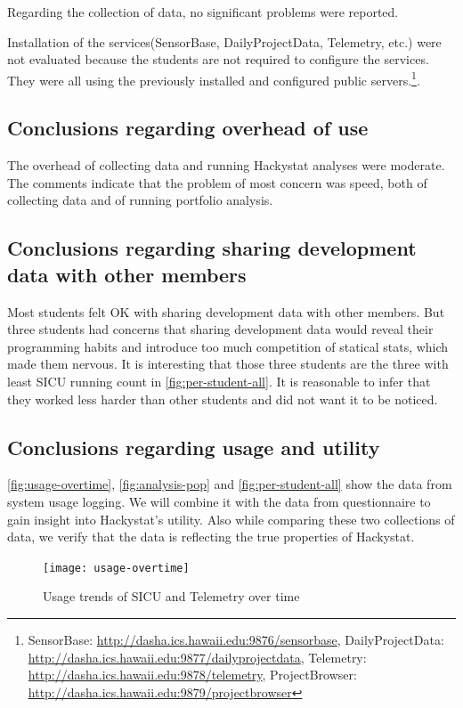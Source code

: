 \documentclass[11pt]{article}
\begin{document}
Regarding the collection of data, no significant problems were reported. 

Installation of the services(SensorBase, DailyProjectData, Telemetry, etc.) were not evaluated because the students are not required to configure the services. They were all using the previously installed and configured public servers.\footnote{SensorBase: \url{http://dasha.ics.hawaii.edu:9876/sensorbase}, DailyProjectData: \url{http://dasha.ics.hawaii.edu:9877/dailyprojectdata}, Telemetry: \url{http://dasha.ics.hawaii.edu:9878/telemetry}, ProjectBrowser: \url{http://dasha.ics.hawaii.edu:9879/projectbrowser}}. 

\subsection {Conclusions regarding overhead of use}
The overhead of collecting data and running Hackystat analyses were moderate. The comments indicate that the problem of most concern was speed, both of collecting data and of running portfolio analysis.

\subsection {Conclusions regarding sharing development data with other members}
Most students felt OK with sharing development data with other members. But three students had concerns that sharing development data would reveal their programming habits and introduce too much competition of statical stats, which made them nervous. It is interesting that those three students are the three with least SICU running count in \autoref{fig:per-student-all}. It is reasonable to infer that they worked less harder than other students and did not want it to be noticed.

\subsection {Conclusions regarding usage and utility}

\autoref{fig:usage-overtime}, \autoref{fig:analysis-pop} and \autoref{fig:per-student-all} show the data from system usage logging. We will combine it with the data from questionnaire to gain insight into Hackystat's utility. Also while comparing these two collections of data, we verify that the data is reflecting the true properties of Hackystat.

\begin{figure}[htbp] %
   \centering
   \texttt{[image: usage-overtime]} 
   \caption{Usage trends of SICU and Telemetry over time}
   \label{fig:usage-overtime}
\end{figure}
\end{document}
